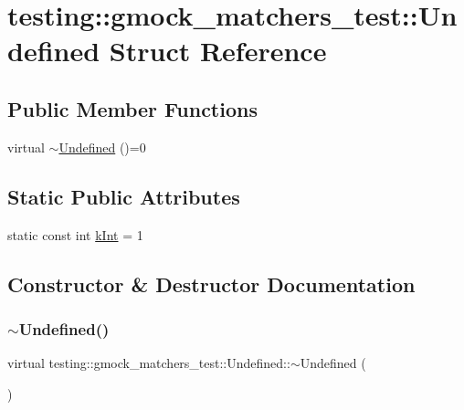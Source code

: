 \hypertarget{structtesting_1_1gmock__matchers__test_1_1_undefined}{}\section{testing\+::gmock\+\_\+matchers\+\_\+test\+::Undefined Struct Reference}
\label{structtesting_1_1gmock__matchers__test_1_1_undefined}
\subsection*{Public Member Functions}
\begin{DoxyCompactItemize}
\item 
virtual \mbox{\hyperlink{structtesting_1_1gmock__matchers__test_1_1_undefined_ace5b68909eae7b32971299176fabae94}{$\sim$\+Undefined}} ()=0
\end{DoxyCompactItemize}
\subsection*{Static Public Attributes}
\begin{DoxyCompactItemize}
\item 
static const int \mbox{\hyperlink{structtesting_1_1gmock__matchers__test_1_1_undefined_a59bddeb8647abbf50ee51b8ca8f0989b}{k\+Int}} = 1
\end{DoxyCompactItemize}


\subsection{Constructor \& Destructor Documentation}
\mbox{\label{structtesting_1_1gmock__matchers__test_1_1_undefined_ace5b68909eae7b32971299176fabae94}} 
\subsubsection{\texorpdfstring{$\sim$Undefined()}{~Undefined()}}
{\footnotesize\ttfamily virtual testing\+::gmock\+\_\+matchers\+\_\+test\+::\+Undefined\+::$\sim$\+Undefined (\begin{DoxyParamCaption}{ }\end{DoxyParamCaption})\hspace{0.3cm}{\ttfamily [pure virtual]}}



